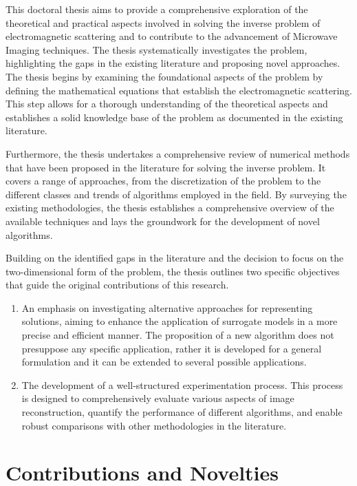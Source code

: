 		This doctoral thesis aims to provide a comprehensive exploration of the theoretical and practical aspects involved in solving the inverse problem of electromagnetic scattering and to contribute to the advancement of Microwave Imaging techniques. The thesis systematically investigates the problem, highlighting the gaps in the existing literature and proposing novel approaches. The thesis begins by examining the foundational aspects of the problem by defining the mathematical equations that establish the electromagnetic scattering. This step allows for a thorough understanding of the theoretical aspects and establishes a solid knowledge base of the problem as documented in the existing literature.
		
		Furthermore, the thesis undertakes a comprehensive review of numerical methods that have been proposed in the literature for solving the inverse problem. It covers a range of approaches, from the discretization of the problem to the different classes and trends of algorithms employed in the field. By surveying the existing methodologies, the thesis establishes a comprehensive overview of the available techniques and lays the groundwork for the development of novel algorithms.
		
		Building on the identified gaps in the literature and the decision to focus on the two-dimensional form of the problem, the thesis outlines two specific objectives that guide the original contributions of this research.
		
		\begin{enumerate}
			\item An emphasis on investigating alternative approaches for representing solutions, aiming to enhance the application of surrogate models in a more precise and efficient manner. The proposition of a new algorithm does not presuppose any specific application, rather it is developed for a general formulation and it can be extended to several possible applications.
			\item The development of a well-structured experimentation process. This process is designed to comprehensively evaluate various aspects of image reconstruction, quantify the performance of different algorithms, and enable robust comparisons with other methodologies in the literature. 
		\end{enumerate}
		
	\section{Contributions and Novelties}\label{chap:introduction:contribution}
	
